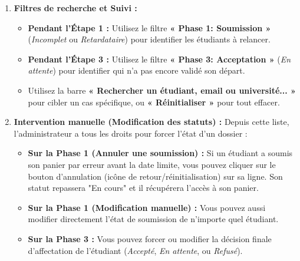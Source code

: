 \documentclass[12pt,a4paper]{article}
\begin{document}
\begin{enumerate}
    \item \textbf{Filtres de recherche et Suivi :}
    \begin{itemize}[leftmargin=*]
        \item \textbf{Pendant l'Étape 1 :} Utilisez le filtre \textbf{« Phase 1: Soumission »} (\textit{Incomplet} ou \textit{Retardataire}) pour identifier les étudiants à relancer.
        \item \textbf{Pendant l'Étape 3 :} Utilisez le filtre \textbf{« Phase 3: Acceptation »} (\textit{En attente}) pour identifier qui n'a pas encore validé son départ.
        \item Utilisez la barre \textbf{« Rechercher un étudiant, email ou université... »} pour cibler un cas spécifique, ou \textbf{« Réinitialiser »} pour tout effacer.
    \end{itemize}
    
    \item \textbf{Intervention manuelle (Modification des statuts) :}
    Depuis cette liste, l'administrateur a tous les droits pour forcer l'état d'un dossier :
    \begin{itemize}[leftmargin=*]
        \item \textbf{Sur la Phase 1 (Annuler une soumission) :} Si un étudiant a soumis son panier par erreur avant la date limite, vous pouvez cliquer sur le bouton d'annulation (icône de retour/réinitialisation) sur sa ligne. Son statut repassera "En cours" et il récupérera l'accès à son panier.
        \item \textbf{Sur la Phase 1 (Modification manuelle) :} Vous pouvez aussi modifier directement l'état de soumission de n'importe quel étudiant.
        \item \textbf{Sur la Phase 3 :} Vous pouvez forcer ou modifier la décision finale d'affectation de l'étudiant (\textit{Accepté}, \textit{En attente}, ou \textit{Refusé}).
    \end{itemize}


\end{enumerate}
\end{document}
